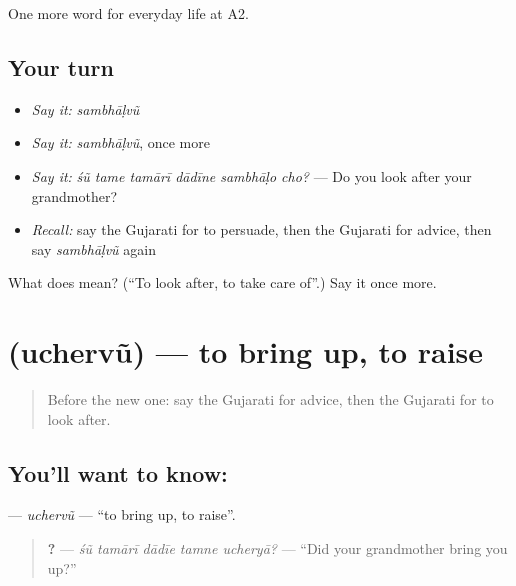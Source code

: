 \begin{grammarlens}[title={What you've built}]
One more word for everyday life at A2.
\end{grammarlens}

\subsection*{Your turn}
\begin{itemize}
\raggedright
  \item \emph{Say it:} \emph{sambhāḷvũ}
  \item \emph{Say it:} \emph{sambhāḷvũ}, once more
  \item \emph{Say it:} \emph{śũ tame tamārī dādīne sambhāḷo cho?} — Do you look after your grandmother?
  \item \emph{Recall:} say the Gujarati for to persuade, then the Gujarati for advice, then say \emph{sambhāḷvũ} again
\end{itemize}

\begin{tcolorbox}[breakable,colback=teal!4,colframe=teal!35!black,title={Before you move on}]
What does  mean? (\textquotedblleft{}To look after, to take care of\textquotedblright{}.) Say it once more.
\end{tcolorbox}
\section[\texorpdfstring{\gu{ઉછેરવું} (uchervũ)}{ઉછેરવું (uchervũ)}]{ (uchervũ) — to bring up, to raise}

\label{lesson:GU-C269-uchervu}



\begin{quote}
Before the new one: say the Gujarati for advice, then the Gujarati for to look after.
\end{quote}

\subsection*{You'll want to know: }
\textbf{} — \emph{uchervũ} — \textquotedblleft{}to bring up, to raise\textquotedblright{}.

\begin{quote}
\textbf{    ?} — \emph{śũ tamārī dādīe tamne ucheryā?} — \textquotedblleft{}Did your grandmother bring you up?\textquotedblright{}
\end{quote}

